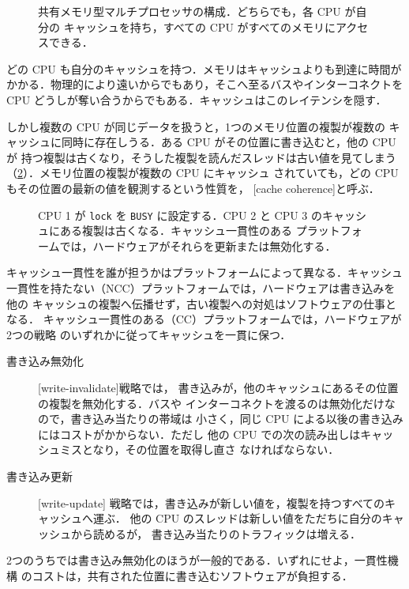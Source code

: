 \documentclass[../main.tex]{subfiles}
\begin{document}
\begin{figure}[htbp]
  \centering
  
  \caption{共有メモリ型マルチプロセッサの構成．どちらでも，各 CPU が自分の
    キャッシュを持ち，すべての CPU がすべてのメモリにアクセスできる．}
  \label{fig:l10-smp}
\end{figure}

どの CPU も自分のキャッシュを持つ．メモリはキャッシュよりも到達に時間が
かかる．物理的により遠いからでもあり，そこへ至るバスやインターコネクトを
CPU どうしが奪い合うからでもある．キャッシュはこのレイテンシを隠す．%

しかし複数の CPU が同じデータを扱うと，1つのメモリ位置の複製が複数の
キャッシュに同時に存在しうる．ある CPU がその位置に書き込むと，他の CPU が
持つ複製は古くなり，そうした複製を読んだスレッドは古い値を見てしまう
（\cref{fig:l10-coherence}）．メモリ位置の複製が複数の CPU にキャッシュ
されていても，どの CPU もその位置の最新の値を観測するという性質を，
[cache coherence]と呼ぶ．

\begin{figure}[htbp]
  \centering
  
  \caption{CPU 1 が \texttt{lock} を \texttt{BUSY} に設定する．CPU 2 と
    CPU 3 のキャッシュにある複製は古くなる．キャッシュ一貫性のある
    プラットフォームでは，ハードウェアがそれらを更新または無効化する．}
  \label{fig:l10-coherence}
\end{figure}

キャッシュ一貫性を誰が担うかはプラットフォームによって異なる．キャッシュ
一貫性を持たない（NCC）プラットフォームでは，ハードウェアは書き込みを他の
キャッシュの複製へ伝播せず，古い複製への対処はソフトウェアの仕事となる．
キャッシュ一貫性のある（CC）プラットフォームでは，ハードウェアが2つの戦略
のいずれかに従ってキャッシュを一貫に保つ．
\begin{description}
  \item[書き込み無効化]
    [write-invalidate]戦略では，
    書き込みが，他のキャッシュにあるその位置の複製を無効化する．バスや
    インターコネクトを渡るのは無効化だけなので，書き込み当たりの帯域は
    小さく，同じ CPU による以後の書き込みにはコストがかからない．ただし
    他の CPU での次の読み出しはキャッシュミスとなり，その位置を取得し直さ
    なければならない．
  \item[書き込み更新] [write-update]%
    戦略では，書き込みが新しい値を，複製を持つすべてのキャッシュへ運ぶ．
    他の CPU のスレッドは新しい値をただちに自分のキャッシュから読めるが，
    書き込み当たりのトラフィックは増える．
\end{description}
2つのうちでは書き込み無効化のほうが一般的である．いずれにせよ，一貫性機構
のコストは，共有された位置に書き込むソフトウェアが負担する．
\end{document}
